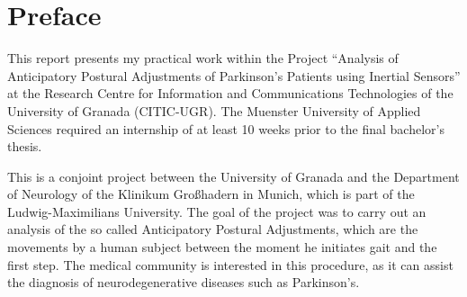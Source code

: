 \chapter*{Preface}

This report presents my practical work within the Project ``Analysis of Anticipatory Postural Adjustments of Parkinson's Patients using Inertial Sensors'' at the Research Centre for Information and Communications Technologies of the University of Granada (CITIC-UGR). The Muenster University of Applied Sciences required an internship of at least 10 weeks prior to the final bachelor's thesis.

This is a conjoint project between the University of Granada and the Department of Neurology of the Klinikum Großhadern in Munich, which is part of the Ludwig-Maximilians University. The goal of the project was to carry out an analysis of the so called Anticipatory Postural Adjustments, which are the movements by a human subject between the moment he initiates gait and the first step. The medical community is interested in this procedure, as it can assist the diagnosis of neurodegenerative diseases such as Parkinson's.